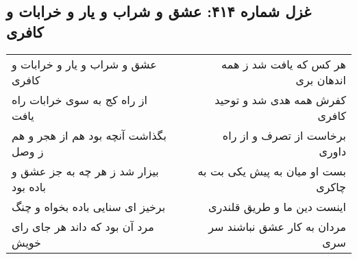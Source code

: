 \begin{center}
\section*{غزل شماره ۴۱۴: عشق و شراب و یار و خرابات و کافری}
\label{sec:414}
\begin{longtable}{l p{0.5cm} r}
عشق و شراب و یار و خرابات و کافری
&&
هر کس که یافت شد ز همه اندهان بری
\\
از راه کج به سوی خرابات راه یافت
&&
کفرش همه هدی شد و توحید کافری
\\
بگذاشت آنچه بود هم از هجر و هم ز وصل
&&
برخاست از تصرف و از راه داوری
\\
بیزار شد ز هر چه به جز عشق و باده بود
&&
بست او میان به پیش یکی بت به چاکری
\\
برخیز ای سنایی باده بخواه و چنگ
&&
اینست دین ما و طریق قلندری
\\
مرد آن بود که داند هر جای رای خویش
&&
مردان به کار عشق نباشند سر سری
\\
\end{longtable}
\end{center}
